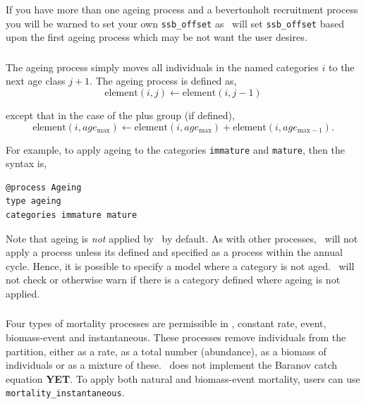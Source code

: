 If you have more than one ageing process and a bevertonholt recruitment process you will be warned to set your own \texttt{ssb\_offset} as \CNAME\ will set \texttt{ssb\_offset} based upon the first ageing process which may be not want the user desires.


\subsubsection{\label{sec:ageing}}
\CH
The ageing process simply moves all individuals in the named categories $i$ to the next age class $j + 1$. The ageing process is defined as,
\begin{equation}
  \text{element}(i,j) \leftarrow \text{element}(i,j-1)
\end{equation}

except that in the case of the plus group (if defined), 
\begin{equation}
  \text{element}(i,age_{\text{max}}) \leftarrow \text{element}(i,age_{\text{max}}) + \text{element}(i,age_{\text{max}-1}).
\end{equation}

For example, to apply ageing to the categories \texttt{immature} and \texttt{mature}, then the syntax is,

{\small{\begin{verbatim}
@process Ageing
type ageing
categories immature mature
\end{verbatim}}}

Note that ageing is \emph{not} applied by \CNAME\ by default. As with other processes, \CNAME\ will not apply a process unless its defined and specified as a process within the annual cycle. Hence, it is possible to specify a model where a category is not aged. \CNAME\ will not check or otherwise warn if there is a category defined where ageing is not applied.

\subsubsection{\label{sec:mortality}}
\CH
Four types of mortality processes are permissible in \CNAME, constant rate, event, biomass-event and instantaneous. These processes remove individuals from the partition, either as a rate, as a total number (abundance), as a biomass of individuals or as a mixture of these. \CNAME\ does not implement the Baranov catch equation \textbf{YET}. To apply both natural and biomass-event mortality, users can use \texttt{mortality\_instantaneous}.

